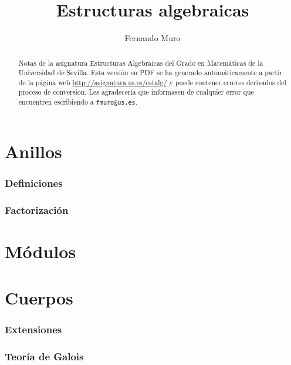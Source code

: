 \documentclass[]{amsart}
\title{Estructuras algebraicas}
\author{Fernando Muro}
\theoremstyle{definition}
\theoremstyle{remark}
\numberwithin{equation}{subsection}
\numberwithin{section}{part}
\begin{document}
\maketitle

\begin{abstract}
Notas de la asignatura Estructuras Algebraicas del Grado en Matemáticas de la Universidad de Sevilla. Esta versión en PDF se ha generado automáticamente a partir de la página web \url{http://asignatura.us.es/estalg/} y puede contener errores derivados del proceso de conversion. Les agradecería que informasen de cualquier error que encuentren escribiendo a \texttt{fmuro@us.es}.
\end{abstract}

\tableofcontents

\part{Anillos}



\section{Definiciones}



\section{Factorización}



\part{Módulos}



\part{Cuerpos}



\section{Extensiones}



\section{Teoría de Galois}


\end{document}
